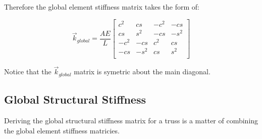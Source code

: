 Therefore the global element stiffness matrix takes the form of:

\begin{equation}
\vec{k}_{global}
=
\frac{AE}{L}
	\begin{bmatrix}
  	c^2 & cs & -c^2 & -cs\\
  	cs & s^2 & -cs & -s^2\\
  	-c^2 & -cs & c^2 & cs\\
  	-cs & -s^2 & cs & s^2\\
	\end{bmatrix}
\end{equation}

Notice that the $\vec{k}_{global}$ matrix is  symetric about the main diagonal. 

\subsection{Global Structural Stiffness}

Deriving the global structural stiffness matrix for a truss is a matter of combining the global element stiffness matricies.


